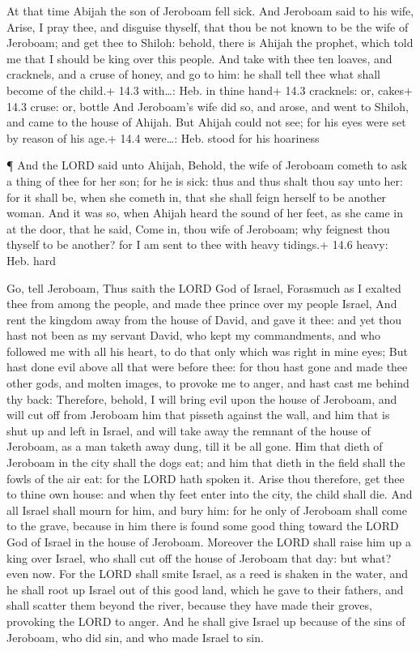  At that time Abijah the son of Jeroboam fell sick.
 And Jeroboam said to his wife, Arise, I pray thee, and
disguise thyself, that thou be not known to be the wife of Jeroboam; and
get thee to Shiloh: behold, there is Ahijah the prophet, which told me
that I should be king over this people.  And take with thee
ten loaves, and cracknels, and a cruse of honey, and go to him: he shall
tell thee what shall become of the child.+ 14.3 with\ldots: Heb. in
thine hand+ 14.3 cracknels: or, cakes+ 14.3 cruse: or, bottle
 And Jeroboam's wife did so, and arose, and went to Shiloh,
and came to the house of Ahijah. But Ahijah could not see; for his eyes
were set by reason of his age.+ 14.4 were\ldots: Heb. stood for his
hoariness

 ¶ And the LORD said unto Ahijah, Behold, the wife of
Jeroboam cometh to ask a thing of thee for her son; for he is sick: thus
and thus shalt thou say unto her: for it shall be, when she cometh in,
that she shall feign herself to be another woman.  And it
was so, when Ahijah heard the sound of her feet, as she came in at the
door, that he said, Come in, thou wife of Jeroboam; why feignest thou
thyself to be another? for I am sent to thee with heavy tidings.+ 14.6
heavy: Heb. hard

 Go, tell Jeroboam, Thus saith the LORD God of Israel,
Forasmuch as I exalted thee from among the people, and made thee prince
over my people Israel,  And rent the kingdom away from the
house of David, and gave it thee: and yet thou hast not been as my
servant David, who kept my commandments, and who followed me with all
his heart, to do that only which was right in mine eyes; 
But hast done evil above all that were before thee: for thou hast gone
and made thee other gods, and molten images, to provoke me to anger, and
hast cast me behind thy back:  Therefore, behold, I will
bring evil upon the house of Jeroboam, and will cut off from Jeroboam
him that pisseth against the wall, and him that is shut up and left in
Israel, and will take away the remnant of the house of Jeroboam, as a
man taketh away dung, till it be all gone.  Him that dieth
of Jeroboam in the city shall the dogs eat; and him that dieth in the
field shall the fowls of the air eat: for the LORD hath spoken it.
 Arise thou therefore, get thee to thine own house: and
when thy feet enter into the city, the child shall die. 
And all Israel shall mourn for him, and bury him: for he only of
Jeroboam shall come to the grave, because in him there is found some
good thing toward the LORD God of Israel in the house of Jeroboam.
 Moreover the LORD shall raise him up a king over Israel,
who shall cut off the house of Jeroboam that day: but what? even now.
 For the LORD shall smite Israel, as a reed is shaken in
the water, and he shall root up Israel out of this good land, which he
gave to their fathers, and shall scatter them beyond the river, because
they have made their groves, provoking the LORD to anger. 
And he shall give Israel up because of the sins of Jeroboam, who did
sin, and who made Israel to sin.


